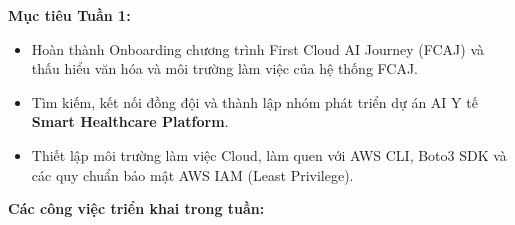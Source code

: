 \vspace{0.5em}\noindent\textbf{Mục tiêu Tuần 1:}

\begin{itemize}
\tightlist
\item
  Hoàn thành Onboarding chương trình First Cloud AI Journey (FCAJ) và
  thấu hiểu văn hóa và môi trường làm việc của hệ thống FCAJ.
\item
  Tìm kiếm, kết nối đồng đội và thành lập nhóm phát triển dự án AI Y tế
  \textbf{Smart Healthcare Platform}.
\item
  Thiết lập môi trường làm việc Cloud, làm quen với AWS CLI, Boto3 SDK
  và các quy chuẩn bảo mật AWS IAM (Least Privilege).
\end{itemize}

\vspace{0.5em}\noindent\textbf{Các công việc triển khai trong tuần:}

